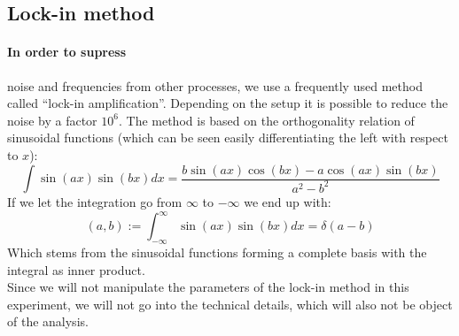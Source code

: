 \subsection{Lock-in method}
\paragraph{In order to supress}
noise and frequencies from other processes, we use
a frequently used method called ``lock-in amplification''. Depending on the
setup it is possible to reduce the noise by a factor $10^6$. The method
is based on the orthogonality relation of sinusoidal functions (which
can be seen easily differentiating the left with respect to $x$):
\begin{equation}
    \int \sin(a x) \sin(b x) dx =\frac{ b \sin(a x) \cos(b x)-a \cos(a x)
            \sin(b x)}{a^2-b^2}
\end{equation}
If we let the integration go from $\infty$ to $-\infty$ we end up with:
\begin{equation}
    (a,b) := \int_{-\infty}^{\infty} \sin(a x) \sin(b x) dx = \delta(a - b)
\end{equation}
Which stems from the sinusoidal functions forming a complete basis with
the integral as inner product.\\
Since we will not manipulate the parameters of the lock-in method in this
experiment, we will not go into the technical details, which
will also not be object of the analysis.
